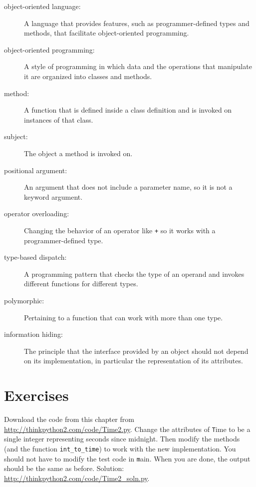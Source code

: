\documentclass[
DIV=11,
fontsize=13,
twoside,
headinclude=false,
titlepage=firstiscover,
abstract=true,
headsepline=true,
footsepline=true,
chapterprefix=true, %
headings=big,
bibliography=totoc,%
captions=tableheading
]{scrbook}
\theoremstyle{definition}
\begin{document}
\begin{description}

\item[object-oriented language:] A language that provides features,
  such as programmer-defined types and methods, that facilitate
  object-oriented programming.

\item[object-oriented programming:] A style of programming in which
data and the operations that manipulate it are organized into classes
and methods.

\item[method:] A function that is defined inside a class definition and
is invoked on instances of that class.

\item[subject:] The object a method is invoked on.

\item[positional argument:]  An argument that does not include
a parameter name, so it is not a keyword argument.

\item[operator overloading:] Changing the behavior of an operator like
{\texttt +} so it works with a programmer-defined type.

\item[type-based dispatch:] A programming pattern that checks the type
of an operand and invokes different functions for different types.

\item[polymorphic:] Pertaining to a function that can work with more
  than one type.  

\item[information hiding:] The principle that the interface provided 
by an object should not depend on its implementation, in particular
the representation of its attributes.

\end{description}


\section{Exercises}

\begin{exercise}
\normalfont

Download the code from this chapter from
\url{http://thinkpython2.com/code/Time2.py}.  Change the attributes of
    {\texttt Time} to be a single integer representing seconds since
    midnight.  Then modify the methods (and the function
    \verb"int_to_time") to work with the new implementation.  You
    should not have to modify the test code in {\texttt main}.  When you
    are done, the output should be the same as before.  Solution:
    \url{http://thinkpython2.com/code/Time2_soln.py}.

\end{exercise}
\end{document}
